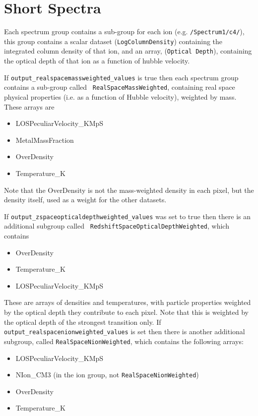 \documentclass{report}
\begin{document}
\section{Short Spectra}

Each spectrum group contains a sub-group for each ion
(e.g. {\tt /Spectrum1/c4/}), this group contains a scalar dataset
({\tt LogColumnDensity}) containing the integrated column density of
that ion, and an array, ({\tt Optical Depth}), containing the optical
depth of that ion as a function of hubble velocity.

If {\tt output\_realspacemassweighted\_values} is true then each
spectrum group contains a sub-group called {\tt
  RealSpaceMassWeighted}, containing real space physical properties
(i.e. as a function of Hubble velocity), weighted by mass.  These
arrays are

\begin{itemize}
\item LOSPeculiarVelocity\_KMpS
\item MetalMassFraction
\item OverDensity
\item Temperature\_K
\end{itemize}
Note that the OverDensity is not the mass-weighted density in each pixel, but the density itself, used as a weight for the other datasets. 

If {\tt output\_zspaceopticaldepthweighted\_values} was set to true
then there is an additional subgroup called {\tt
  RedshiftSpaceOpticalDepthWeighted}, which contains

\begin{itemize}
\item OverDensity
\item Temperature\_K
\item LOSPeculiarVelocity\_KMpS
\end{itemize}

These are arrays of densities and temperatures, with particle properties weighted by the optical depth they contribute to each pixel. Note that this is weighted by the optical depth of the strongest transition only. If {\tt output\_realspacenionweighted\_values} is set then there is another additional subgroup, called {\tt RealSpaceNionWeighted}, which contains the following arrays:

\begin{itemize}
\item LOSPeculiarVelocity\_KMpS
\item NIon\_CM3 (in the ion group, not {\tt RealSpaceNionWeighted})
\item OverDensity
\item Temperature\_K
\end{itemize}
\end{document}
